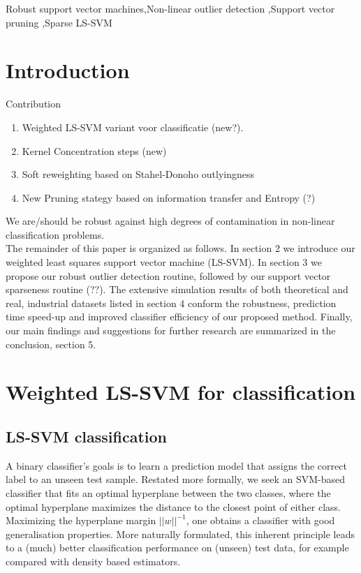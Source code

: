 \documentclass[preprint,12pt]{elsarticle}
\begin{document}
\begin{frontmatter}
\begin{abstract}
\end{abstract}

\begin{keyword}
	Robust support vector machines\sep Non-linear outlier detection \sep Support vector pruning \sep Sparse LS-SVM 
\end{keyword}
\end{frontmatter}


\newpage
\section{Introduction}

Contribution
\begin{enumerate}
	\item Weighted LS-SVM variant voor classificatie (new?).
	\item Kernel Concentration steps (new)
	\item Soft reweighting based on Stahel-Donoho outlyingness
	\item New Pruning stategy based on information transfer and Entropy (?)
\end{enumerate}
We are/should be robust against high degrees of contamination in non-linear classification problems. \\

The remainder of this paper is organized as follows. In section 2 we introduce our weighted least squares support vector machine (LS-SVM). In section 3 we propose our robust outlier detection routine, followed by our support vector sparseness routine (??). The extensive simulation results of both theoretical and real, industrial datasets listed in section 4 conform the robustness, prediction time speed-up and improved classifier efficiency of our proposed method. Finally, our main findings and suggestions for further research are summarized in the conclusion, section 5. 

\section{Weighted LS-SVM for classification}
\subsection{LS-SVM classification}
A binary classifier's goals is to learn a prediction model that assigns the correct label to an unseen test sample. Restated more formally, we seek an SVM-based classifier that fits an optimal hyperplane between the two classes, where the optimal hyperplane maximizes the distance to the closest point of either class. Maximizing the hyperplane margin $||w||^{-1}$, one obtains a classifier with good generalisation properties. More naturally formulated, this inherent principle leads to a (much) better classification performance on (unseen) test data, for example compared with density based estimators. \\
\end{document}

